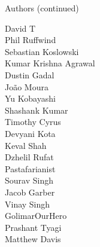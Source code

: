 \begin{frame}{Authors (continued)}
\begin{multicols}{5}
David T\\
Phil Ruffwind\\
Sebastian Koslowski\\
Kumar Krishna Agrawal\\
Dustin Gadal\\
João Moura\\
Yu Kobayashi\\
Shashank Kumar\\
Timothy Cyrus\\
Devyani Kota\\
Keval Shah\\
Dzhelil Rufat\\
Pastafarianist\\
Sourav Singh\\
Jacob Garber\\
Vinay Singh\\
GolimarOurHero\\
Prashant Tyagi\\
Matthew Davis\\
\end{multicols}
\end{frame}
